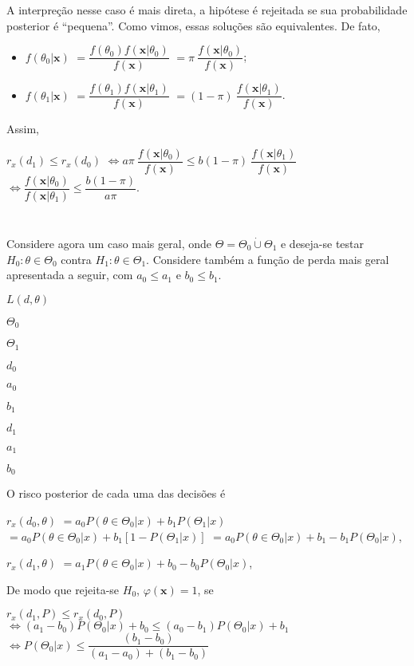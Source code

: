 \documentclass[
]{book}
\begin{document}
A interpreção nesse caso é mais direta, a hipótese é rejeitada se sua probabilidade posterior é ``pequena''. Como vimos, essas soluções são equivalentes. De fato,

\begin{itemize}
\item
  \(f(\theta_0|\boldsymbol x)\) \(=\dfrac{f(\theta_0)f(\boldsymbol x|\theta_0)}{f(\boldsymbol x)}\) \(=\pi~\dfrac{f(\boldsymbol x|\theta_0)}{f(\boldsymbol x)}\);
\item
  \(f(\theta_1|\boldsymbol x)\) \(=\dfrac{f(\theta_1)f(\boldsymbol x|\theta_1)}{f(\boldsymbol x)}\) \(=(1-\pi)~\dfrac{f(\boldsymbol x|\theta_1)}{f(\boldsymbol x)}\).
\end{itemize}

Assim,

\(r_x(d_1) \leq r_x(d_0)\)
\(\Longleftrightarrow a \pi~\dfrac{f(\boldsymbol x|\theta_0)}{f(\boldsymbol x)} \leq b (1-\pi)~\dfrac{f(\boldsymbol x|\theta_1)}{f(\boldsymbol x)}\)
\(\Longleftrightarrow \dfrac{f(\boldsymbol x|\theta_0)}{f(\boldsymbol x|\theta_1)} \leq \dfrac{b (1-\pi)}{a \pi}\).

\(~\)

\(~\)

Considere agora um caso mais geral, onde \(\Theta=\Theta_0 \dot{\cup} \Theta_1\) e deseja-se testar \(H_0: \theta \in \Theta_0\) contra \(H_1: \theta \in \Theta_1\). Considere também a função de perda mais geral apresentada a seguir, com \(a_0 \leq a_1\) e \(b_0 \leq b_1\).

\(L(d,\theta)\)

\(\Theta_0\)

\(\Theta_1\)

\(d_0\)

\(a_0\)

\(b_1\)

\(d_1\)

\(a_1\)

\(b_0\)

O risco posterior de cada uma das decisões é

\(r_x(d_0,\theta)\) \(=a_0P(\theta\in\Theta_0|x)+b_1P(\Theta_1|x)\) \(=a_0P(\theta\in\Theta_0|x)+b_1\left[1- P(\Theta_1|x)\right]\) \(=a_0P(\theta\in\Theta_0|x)+b_1-b_1P(\Theta_0|x)\),

\(r_x(d_1,\theta)\) \(=a_1P(\theta\in\Theta_0|x)+b_0-b_0P(\Theta_0|x)\),

De modo que rejeita-se \(H_0\), \(\varphi(\boldsymbol x)=1\), se

\(r_x(d_1,P)\leq r_x(d_0,P)\) \(\Leftrightarrow (a_1-b_0)P(\Theta_0|x)+b_0 \leq (a_0-b_1)P(\Theta_0|x)+b_1\) \(\Leftrightarrow P(\Theta_0|x) \leq \dfrac{(b_1-b_0)}{(a_1-a_0)+(b_1-b_0)}\)
\end{document}
